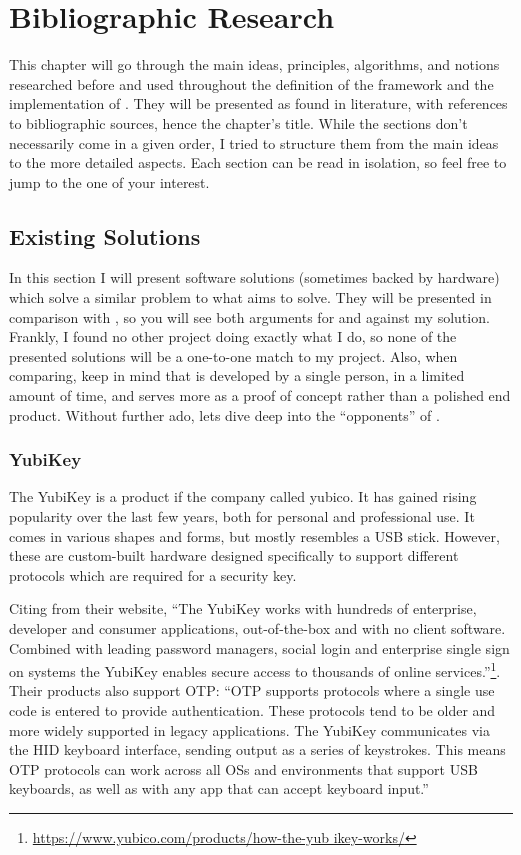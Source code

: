 \chapter{Bibliographic Research} \label{lab:ch3-bibliographic-research}

This chapter will go through the main ideas, principles, algorithms, and notions researched before and used throughout the definition of the framework and the implementation of \app{}.
They will be presented as found in literature, with references to bibliographic sources, hence the chapter's title.
While the sections don't necessarily come in a given order, I tried to structure them from the main ideas to the more detailed aspects.
Each section can be read in isolation, so feel free to jump to the one of your interest.



\section{Existing Solutions}

In this section I will present software solutions (sometimes backed by hardware) which solve a similar problem to what \app{} aims to solve.
They will be presented in comparison with \app{}, so you will see both arguments for and against my solution.
Frankly, I found no other project doing exactly what I do, so none of the presented solutions will be a one-to-one match to my project.
Also, when comparing, keep in mind that \app{} is developed by a single person, in a limited amount of time, and serves more as a proof of concept rather than a polished end product. Without further ado, lets dive deep into the ``opponents'' of \app{}.



\subsection{YubiKey} \label{lab:c3-yubikey}
The YubiKey is a product if the company called yubico.
It has gained rising popularity over the last few years, both for personal and professional use.
It comes in various shapes and forms, but mostly resembles a USB stick.
However, these are custom-built hardware designed specifically to support different protocols which are required for a security key.

Citing from their website, ``The YubiKey works with hundreds of enterprise, developer and consumer applications, out-of-the-box and with no client software.
Combined with leading password managers, social login and enterprise single sign on systems the YubiKey enables secure access to thousands of online services.''\footnote{\url{https://www.yubico.com/products/how-the-yub
ikey-works/}}.
Their products also support OTP:
``OTP supports protocols where a single use code is entered to provide authentication.
These protocols tend to be older and more widely supported in legacy applications.
The YubiKey communicates via the HID keyboard interface, sending output as a series of keystrokes.
This means OTP protocols can work across all OSs and environments that support USB keyboards, as well as with any app that can accept keyboard input.''

